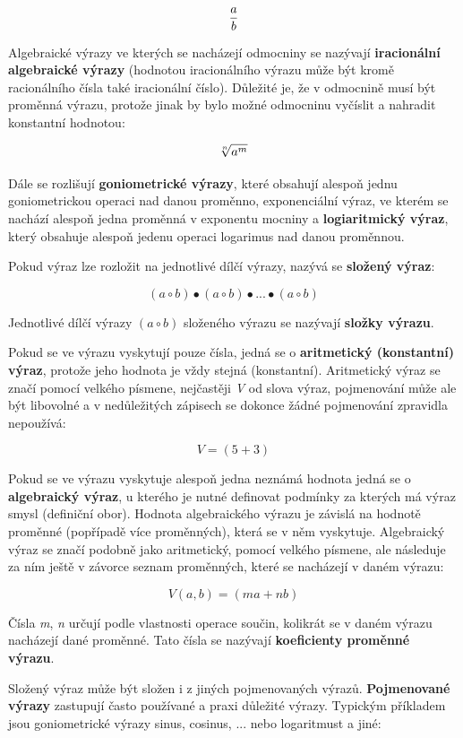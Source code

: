 \documentclass[11pt]{article}
\begin{document}
$$ {a \over b}$$

Algebraické výrazy ve kterých se nacházejí odmocniny se nazývají {\bf iracionální algebraické výrazy} (hodnotou iracionálního výrazu může být kromě racionálního čísla také iracionální číslo). Důležité je, že v odmocnině musí být proměnná výrazu, protože jinak by bylo možné odmocninu vyčíslit a nahradit konstantní hodnotou:

$$ \root n\of{a^m} $$

Dále se rozlišují {\bf goniometrické výrazy}, které obsahují alespoň jednu goniometrickou operaci nad danou proměnno, {exponenciální výraz}, ve kterém se nachází alespoň jedna proměnná v exponentu mocniny a {\bf logiaritmický výraz}, který obsahuje alespoň jedenu operaci logarimus nad danou proměnnou.


Pokud výraz lze rozložit na jednotlivé dílčí výrazy, nazývá se {\bf složený výraz}:

$$ (a \circ b) \bullet (a \circ b) \bullet ... \bullet (a \circ b) $$

Jednotlivé dílčí výrazy $(a \circ b)$ složeného výrazu se nazývají {\bf složky výrazu}.

Pokud se ve výrazu vyskytují pouze čísla, jedná se o {\bf aritmetický (konstantní) výraz}, protože jeho hodnota je vždy stejná (konstantní). Aritmetický výraz se značí pomocí velkého písmene, nejčastěji {\it V} od slova výraz, pojmenování může ale být libovolné a v nedůležitých zápisech se dokonce žádné pojmenování zpravidla nepoužívá:

$$ V = (5 + 3) $$

Pokud se ve výrazu vyskytuje alespoň jedna neznámá hodnota jedná se o {\bf algebraický výraz}, u kterého je nutné definovat podmínky za kterých má výraz smysl (definiční obor). Hodnota algebraického výrazu je závislá na hodnotě proměnné (popřípadě více proměnných), která se v něm vyskytuje. Algebraický výraz se značí podobně jako aritmetický, pomocí velkého písmene, ale následuje za ním ještě v závorce seznam proměnných, které se nacházejí v daném výrazu:

$$ V(a,b) = (ma + nb) $$

Čísla {\it m}, {\it n} určují podle vlastnosti operace součin, kolikrát se v daném výrazu nacházejí dané proměnné. Tato čísla se nazývají {\bf koeficienty proměnné výrazu}.

Složený výraz může být složen i z jiných pojmenovaných výrazů. {\bf Pojmenované výrazy} zastupují často používané a praxi důležité výrazy. Typickým příkladem jsou goniometrické výrazy sinus, cosinus, ... nebo logaritmust a jiné:
\end{document}
